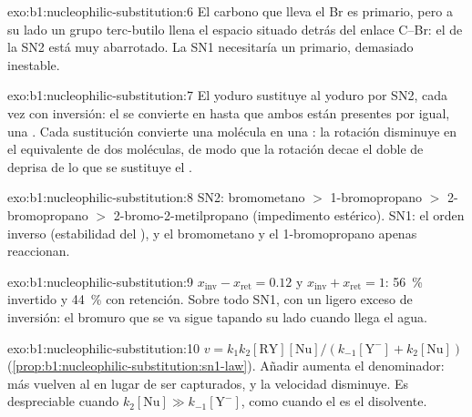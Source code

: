 \begin{solution}{exo:b1:nucleophilic-substitution:6}
El carbono que lleva el Br es primario, pero a su lado un grupo
terc-butilo llena el espacio situado detrás del enlace C--Br: el  de la SN2 está muy abarrotado. La SN1 necesitaría un
 primario, demasiado inestable.
\end{solution}

\begin{solution}{exo:b1:nucleophilic-substitution:7}
El yoduro sustituye al yoduro por SN2, cada vez con inversión: el
 se convierte en  hasta que ambos están presentes por
igual, una . Cada sustitución convierte una molécula
 en una : la rotación disminuye en el equivalente de dos
moléculas, de modo que la rotación decae el doble de deprisa de lo que se
sustituye el .
\end{solution}

\begin{solution}{exo:b1:nucleophilic-substitution:8}
SN2: bromometano $>$ 1-bromopropano $>$ 2-bromopropano $>$
2-bromo-2-metilpropano (impedimento estérico). SN1: el orden inverso
(estabilidad del ), y el bromometano y el 1-bromopropano
apenas reaccionan.
\end{solution}

\begin{solution}{exo:b1:nucleophilic-substitution:9}
$x_{\text{inv}} - x_{\text{ret}} = 0.12$ y $x_{\text{inv}} + x_{\text{ret}} = 1$:
\qty{56}{\percent} invertido y \qty{44}{\percent} con retención. Sobre
todo  SN1, con un ligero exceso de inversión: el bromuro que
se va sigue tapando su lado cuando llega el agua.
\end{solution}

\begin{solution}{exo:b1:nucleophilic-substitution:10}
$v = k_1k_2[\mathrm{RY}][\mathrm{Nu}]/(k_{-1}[\mathrm{Y^-}] + k_2[\mathrm{Nu}])$
(\cref{prop:b1:nucleophilic-substitution:sn1-law}). Añadir 
aumenta el denominador: más  vuelven al  en lugar de
ser capturados, y la velocidad disminuye. Es despreciable cuando
$k_2[\mathrm{Nu}] \gg k_{-1}[\mathrm{Y^-}]$, como cuando el  es
el disolvente.
\end{solution}

